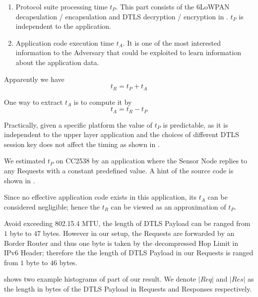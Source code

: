 \begin{enumerate}
	\item Protocol suite processing time $t_P$. This part consists of the 6LoWPAN decapsulation / encapsulation and DTLS decryption / encryption in . $t_P$ is independent to the application. 
	\item Application code execution time $t_A$. It is one of the most interested information to the Adversary that could be exploited to learn information about the application data.
\end{enumerate}

Apparently we have
\begin{equation}
t_R = t_P + t_A
\end{equation}

One way to extract $t_A$ is to compute it by 
\begin{equation} \label{Eq: t_A}
t_A = t_R - t_P
\end{equation}

Practically, given a specific platform the value of $t_P$ is predictable, as it is independent to the upper layer application and the choices of different DTLS session key does not affect the timing as shown in . 

We estimated $t_P$ on CC2538 by an application where the Sensor Node replies to any Requests with a constant predefined value. A hint of the source code is shown in .

 

Since no effective application code exists in this application, its $t_A$ can be considered negligible; hence the $t_R$ can be viewed as an approximation of $t_P$.

Avoid exceeding 802.15.4 MTU, the length of DTLS Payload can be ranged from $1$ byte to $47$ bytes. However in our setup, the Requests are forwarded by an Border Router and thus one byte is taken by the decompressed Hop Limit in IPv6 Header; therefore the the length of DTLS Payload in our Requests is ranged from $1$ byte to $46$ bytes.

 shows two example histograms of part of our result. We denote $|Req|$ and $|Res|$ as the length in bytes of the DTLS Payload in Requests and Responses respectively.

